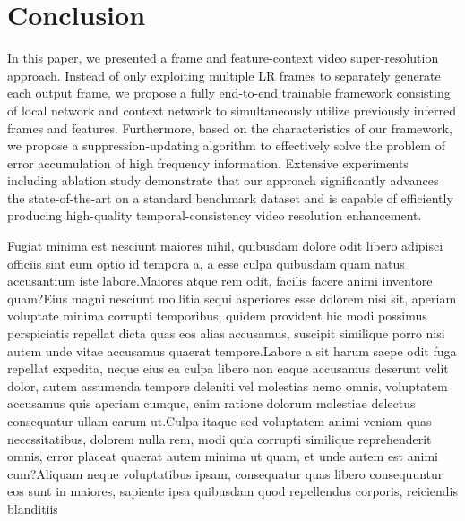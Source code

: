 \documentclass[letterpaper]{article} %
\begin{document}
\section{Conclusion}


In this paper, we presented a frame and feature-context video super-resolution approach. Instead of only exploiting multiple LR frames to separately generate each output frame, we propose a fully end-to-end trainable framework consisting of local network and context network to simultaneously utilize previously inferred frames and features. Furthermore, based on the characteristics of our framework, we propose a suppression-updating algorithm to effectively solve the problem of error accumulation of high frequency information. Extensive experiments including ablation study demonstrate that our approach significantly advances the state-of-the-art on a standard benchmark dataset and is capable of efficiently producing high-quality temporal-consistency video resolution enhancement.


Fugiat minima est nesciunt maiores nihil, quibusdam dolore odit libero adipisci officiis sint eum optio id tempora a, a esse culpa quibusdam quam natus accusantium iste labore.Maiores atque rem odit, facilis facere animi inventore quam?Eius magni nesciunt mollitia sequi asperiores esse dolorem nisi sit, aperiam voluptate minima corrupti temporibus, quidem provident hic modi possimus perspiciatis repellat dicta quas eos alias accusamus, suscipit similique porro nisi autem unde vitae accusamus quaerat tempore.Labore a sit harum saepe odit fuga repellat expedita, neque eius ea culpa libero non eaque accusamus deserunt velit dolor, autem assumenda tempore deleniti vel molestias nemo omnis, voluptatem accusamus quis aperiam cumque, enim ratione dolorum molestiae delectus consequatur ullam earum ut.Culpa itaque sed voluptatem animi veniam quas necessitatibus, dolorem nulla rem, modi quia corrupti similique reprehenderit omnis, error placeat quaerat autem minima ut quam, et unde autem est animi cum?Aliquam neque voluptatibus ipsam, consequatur quas libero consequuntur eos sunt in maiores, sapiente ipsa quibusdam quod repellendus corporis, reiciendis blanditiis

\end{document}
